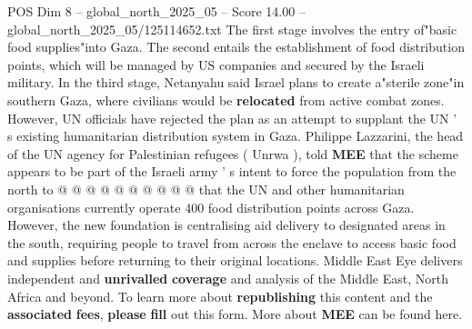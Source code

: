 \begin{textsample}{POS Dim 8 – global\_north\_2025\_05 – Score 14.00 – global\_north\_2025\_05/125114652.txt}
The first stage involves the entry of"basic food supplies"into Gaza.
The second entails the establishment of food distribution points, which will be managed by US companies and secured by the Israeli military.
In the third stage, Netanyahu said Israel plans to create a"sterile zone"in southern Gaza, where civilians would be \textbf{relocated} from active combat zones.
However, UN officials have rejected the plan as an attempt to supplant the UN ' s existing humanitarian distribution system in Gaza.
Philippe Lazzarini, the head of the UN agency for Palestinian refugees ( Unrwa ), told \textbf{MEE} that the scheme appears to be part of the Israeli army ' s intent to force the population from the north to @ @ @ @ @ @ @ @ @ @ that the UN and other humanitarian organisations currently operate 400 food distribution points across Gaza.
However, the new foundation is centralising aid delivery to designated areas in the south, requiring people to travel from across the enclave to access basic food and supplies before returning to their original locations.
Middle East Eye delivers independent and \textbf{unrivalled} \textbf{coverage} and analysis of the Middle East, North Africa and beyond.
To learn more about \textbf{republishing} this content and the \textbf{associated} \textbf{fees}, \textbf{please} \textbf{fill} out this form.
More about \textbf{MEE} can be found here.

\end{textsample}
